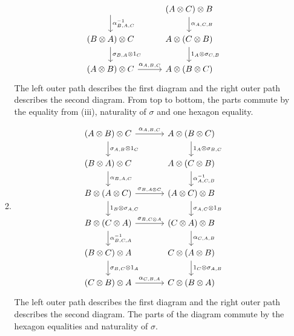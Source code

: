 \begin{answer}
\begin{enumerate}
\begin{enumerate}
\[\begin{tikzcd}[column sep=0.5cm]
          \arrow[d, "\alpha_{B, A, C}^{-1}"] &&
        (A \otimes C) \otimes B
          \arrow[d, "\alpha_{A, C, B}"] \\
        (B \otimes A) \otimes C
          \arrow[d, "\sigma_{B, A} \otimes 1_C"] &&
        A \otimes (C \otimes B)
          \arrow[d, "1_A \otimes \sigma_{C, B}"] \\
        (A \otimes B) \otimes C
          \arrow[rr, "\alpha_{A, B, C}"] &&
        A \otimes (B \otimes C)
      \end{tikzcd} \]
      The left outer path describes the first diagram and the right outer path describes the second diagram.
      From top to bottom, the parts commute by the equality from (iii), naturality of $\sigma$ and one hexagon equality.

    \item
      \[ \begin{tikzcd}[column sep=1.2cm]
        (A \otimes B) \otimes C
          \arrow[r, "\alpha_{A, B, C}"]
          \arrow[d, "\sigma_{A, B} \otimes 1_C"] &
        A \otimes (B \otimes C)
          \arrow[d, "1_A \otimes \sigma_{B, C}"] \\
        (B \otimes A) \otimes C
          \arrow[d, "\alpha_{B, A, C}"] &
        A \otimes (C \otimes B)
          \arrow[d, "\alpha_{A, C, B}^{-1}"] \\
        B \otimes (A \otimes C)
          \arrow[r, "\sigma_{B, A \otimes C}"]
          \arrow[d, "1_B \otimes \sigma_{A, C}"] &
        (A \otimes C) \otimes B
          \arrow[d, "\sigma_{A, C} \otimes 1_B"] \\
        B \otimes (C \otimes A)
          \arrow[r, "\sigma_{B, C \otimes A}"]
          \arrow[d, "\alpha_{B, C, A}^{-1}"] &
        (C \otimes A) \otimes B
          \arrow[d, "\alpha_{C, A, B}"] \\
        (B \otimes C) \otimes A
          \arrow[d, "\sigma_{B, C} \otimes 1_A"] &
        C \otimes (A \otimes B)
          \arrow[d, "1_C \otimes \sigma_{A, B}"] \\
        (C \otimes B) \otimes A
          \arrow[r, "\alpha_{C, B, A}"] &
        C \otimes (B \otimes A)
      \end{tikzcd} \]
      The left outer path describes the first diagram and the right outer path describes the second diagram.
      The parts of the diagram commute by the hexagon equalities and naturality of $\sigma$.


\end{enumerate}
\end{enumerate}
\end{answer}
